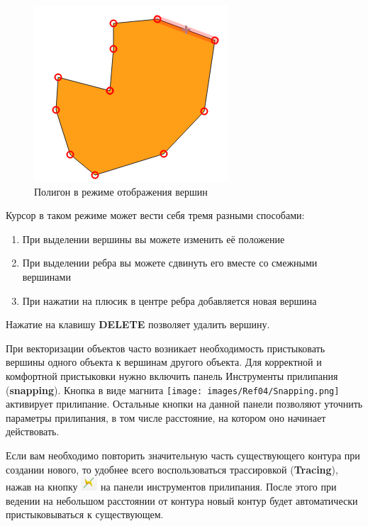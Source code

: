 \documentclass[
  12pt,
]{book}
\begin{document}
\begin{figure}
\centering
\includegraphics{images/vector/Polygon.png}
\caption{Полигон в режиме отображения вершин}
\end{figure}

Курсор в таком режиме может вести себя тремя разными способами:

\begin{enumerate}
\def\labelenumi{\arabic{enumi})}
\item
  При выделении вершины вы можете изменить её положение
\item
  При выделении ребра вы можете сдвинуть его вместе со смежными вершинами
\item
  При нажатии на плюсик в центре ребра добавляется новая вершина
\end{enumerate}

Нажатие на клавишу \textbf{DELETE} позволяет удалить вершину.

При векторизации объектов часто возникает необходимость пристыковать вершины одного объекта к вершинам другого объекта. Для корректной и комфортной пристыковки нужно включить панель Инструменты прилипания (\textbf{snapping}). Кнопка в виде магнита \texttt{[image: images/Ref04/Snapping.png]} активирует прилипание. Остальные кнопки на данной панели позволяют уточнить параметры прилипания, в том числе расстояние, на котором оно начинает действовать.

Если вам необходимо повторить значительную часть существующего контура при создании нового, то удобнее всего воспользоваться трассировкой (\textbf{Tracing}), нажав на кнопку \includegraphics{images/vector/Tracing.png} на панели инструментов прилипания. После этого при ведении на небольшом расстоянии от контура новый контур будет автоматически пристыковываться к существующем.
\end{document}
